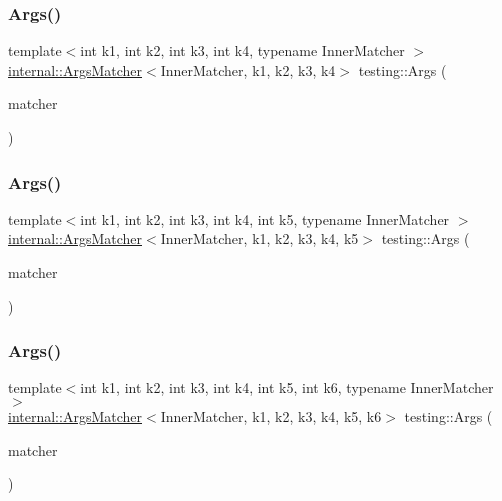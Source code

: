 \mbox{\label{namespacetesting_aeff7e644fd00516c3519fe8c0dc1aee2}} 
\subsubsection{\texorpdfstring{Args()}{Args()}\hspace{0.1cm}{\footnotesize\ttfamily [5/11]}}
{\footnotesize\ttfamily template$<$int k1, int k2, int k3, int k4, typename Inner\+Matcher $>$ \\
\hyperlink{classtesting_1_1internal_1_1_args_matcher}{internal\+::\+Args\+Matcher}$<$Inner\+Matcher, k1, k2, k3, k4$>$ testing\+::\+Args (\begin{DoxyParamCaption}\item[{const Inner\+Matcher \&}]{matcher }\end{DoxyParamCaption})\hspace{0.3cm}{\ttfamily [inline]}}

\mbox{\label{namespacetesting_aede9fd33cce0d21f5e31ba10a0706827}} 
\subsubsection{\texorpdfstring{Args()}{Args()}\hspace{0.1cm}{\footnotesize\ttfamily [6/11]}}
{\footnotesize\ttfamily template$<$int k1, int k2, int k3, int k4, int k5, typename Inner\+Matcher $>$ \\
\hyperlink{classtesting_1_1internal_1_1_args_matcher}{internal\+::\+Args\+Matcher}$<$Inner\+Matcher, k1, k2, k3, k4, k5$>$ testing\+::\+Args (\begin{DoxyParamCaption}\item[{const Inner\+Matcher \&}]{matcher }\end{DoxyParamCaption})\hspace{0.3cm}{\ttfamily [inline]}}

\mbox{\label{namespacetesting_abc92e87b4a9cad372b082d81479f3d48}} 
\subsubsection{\texorpdfstring{Args()}{Args()}\hspace{0.1cm}{\footnotesize\ttfamily [7/11]}}
{\footnotesize\ttfamily template$<$int k1, int k2, int k3, int k4, int k5, int k6, typename Inner\+Matcher $>$ \\
\hyperlink{classtesting_1_1internal_1_1_args_matcher}{internal\+::\+Args\+Matcher}$<$Inner\+Matcher, k1, k2, k3, k4, k5, k6$>$ testing\+::\+Args (\begin{DoxyParamCaption}\item[{const Inner\+Matcher \&}]{matcher }\end{DoxyParamCaption})\hspace{0.3cm}{\ttfamily [inline]}}

